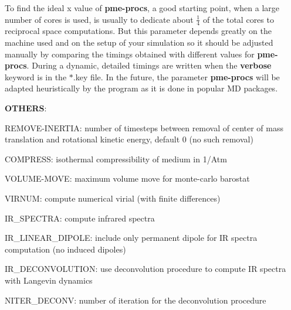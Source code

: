 To find the ideal {\ttfamily x} value of {\bfseries pme-\/procs}, a good starting point, when a large number of cores is used, is usually to dedicate about $\frac{1}{4}$ of the total cores to reciprocal space computations. But this parameter depends greatly on the machine used and on the setup of your simulation so it should be adjusted manually by comparing the timings obtained with different values for {\bfseries pme-\/procs}. During a dynamic, detailed timings are written when the {\bfseries verbose} keyword is in the $\ast$.key file. In the future, the parameter {\bfseries pme-\/procs} will be adapted heuristically by the program as it is done in popular M\-D packages.

{\bfseries O\-T\-H\-E\-R\-S}\-:
\begin{DoxyItemize}
\item R\-E\-M\-O\-V\-E-\/\-I\-N\-E\-R\-T\-I\-A\-: number of timesteps between removal of center of mass translation and rotational kinetic energy, default 0 (no such removal)
\item C\-O\-M\-P\-R\-E\-S\-S\-: isothermal compressibility of medium in 1/\-Atm
\item V\-O\-L\-U\-M\-E-\/\-M\-O\-V\-E\-: maximum volume move for monte-\/carlo barostat
\item V\-I\-R\-N\-U\-M\-: compute numerical virial (with finite differences)
\item I\-R\-\_\-\-S\-P\-E\-C\-T\-R\-A\-: compute infrared spectra
\item I\-R\-\_\-\-L\-I\-N\-E\-A\-R\-\_\-\-D\-I\-P\-O\-L\-E\-: include only permanent dipole for I\-R spectra computation (no induced dipoles)
\item I\-R\-\_\-\-D\-E\-C\-O\-N\-V\-O\-L\-U\-T\-I\-O\-N\-: use deconvolution procedure to compute I\-R spectra with Langevin dynamics
\item N\-I\-T\-E\-R\-\_\-\-D\-E\-C\-O\-N\-V\-: number of iteration for the deconvolution procedure 
\end{DoxyItemize}